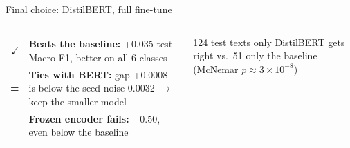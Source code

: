 \documentclass[aspectratio=169,10pt,t]{beamer}
\newcommand{\yes}{\textcolor{okc}{$\checkmark$}}
\newcommand{\no}{\textcolor{failc}{\ding{55}}}
\newcommand{\sbf}{\bfseries}
\begin{document}
\begin{frame}{Final choice: DistilBERT, full fine-tune}
\begin{columns}[T,onlytextwidth]
\begin{card}
{\begin{tabularx}{\linewidth}{@{}c@{\hspace{5pt}}Y@{}}
    \yes & {\sbf Beats the baseline:} +0.035 test Macro-F1, better on all 6 classes\\[3pt]
    {\sbf\color{accent}=} & {\sbf Ties with BERT:} gap +0.0008 is below the seed noise 0.0032 $\rightarrow$ keep the smaller model\\[3pt]
    \no & {\sbf Frozen encoder fails:} $-$0.50, even below the baseline\\
  \end{tabularx}}
\end{card}
\vskip4pt
\begin{softcard}
  {\scriptsize 124 test texts only DistilBERT gets right vs.\ 51 only the baseline (McNemar $p\approx3\times10^{-8}$)}
\end{softcard}
\end{columns}
\end{frame}
\end{document}
